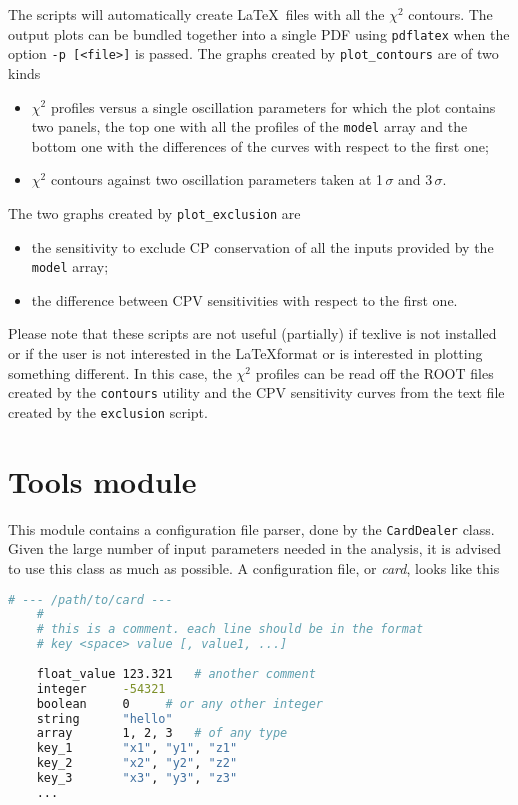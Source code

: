 \documentclass[a4paper, 11pt]{article}
\begin{document}
The scripts will automatically create \LaTeX\ files with all the $\chi^2$ contours. 
The output plots can be bundled together into a single PDF using \texttt{pdflatex} %
when the option \texttt{-p [<file>]} is passed.
The graphs created by \texttt{plot\_contours} are of two kinds
\begin{itemize}
	\item $\chi^2$ profiles versus a single oscillation parameters for which the plot %
		contains two panels, the top one with all the profiles of the \texttt{model} array %
		and the bottom one with the differences of the curves with respect to the first one;
	\item $\chi^2$ contours against two oscillation parameters taken at 1\,$\sigma$ and 3\,$\sigma$.
\end{itemize}
The two graphs created by \texttt{plot\_exclusion} are
\begin{itemize}
	\item the sensitivity to exclude CP conservation of all the inputs provided by %
		the \texttt{model} array;
	\item the difference between CPV sensitivities with respect to the first one.
\end{itemize}

Please note that these scripts are not useful (partially) if texlive is not installed or %
if the user is not interested in the \LaTeX format or is interested in plotting something different.
In this case, the $\chi^2$ profiles can be read off the ROOT files created by the \texttt{contours} %
utility and the CPV sensitivity curves from the text file created by the \texttt{exclusion} script.


\section{Tools module}
\label{sec:tools}

This module contains a configuration file parser, done by the \texttt{CardDealer} class.
Given the large number of input parameters needed in the analysis, it is advised to use this class as much as possible.
A configuration file, or \emph{card}, looks like this
\begin{lstlisting}[language=bash]
    # --- /path/to/card ---
    #
    # this is a comment. each line should be in the format
    # key <space> value [, value1, ...]
    
    float_value	123.321	  # another comment
    integer		-54321
    boolean		0	  # or any other integer
    string		"hello"
    array		1, 2, 3	  # of any type
    key_1		"x1", "y1", "z1"
    key_2		"x2", "y2", "z2"
    key_3		"x3", "y3", "z3"
    ...
\end{lstlisting}
\end{document}
